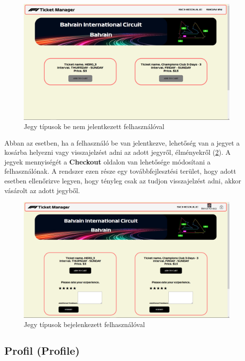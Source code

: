 \begin{figure}[!h]
	\centering
	\includegraphics[scale=0.2]{images/tickets}
	\caption{Jegy típusok be nem jelentkezett felhasználóval}
	\label{abra:ticketsUA}
\end{figure}

Abban az esetben, ha a felhasználó be van jelentkezve, lehetőség van a jegyet a kosárba helyezni vagy visszajelzést adni az adott jegyről, élményekről (\ref{abra:ticketsAuth}). A jegyek mennyiségét a \textbf{Checkout} oldalon van lehetősége módosítani a felhasználónak. A rendszer ezen része egy továbbfejlesztési terület, hogy adott esetben ellenőrizve legyen, hogy tényleg csak az tudjon visszajelzést adni, akkor vásárolt az adott jegyből. 

\begin{figure}[!h]
	\centering
	\includegraphics[scale=0.2]{images/ticketsAuth}
	\caption{Jegy típusok bejelenkezett felhasználóval}
	\label{abra:ticketsAuth}
\end{figure}

\subsection {Profil (Profile)}

